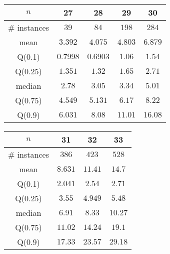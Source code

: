 \begin{tabular}{c|cccc} 
\hline 
$n$ & 27 & 28 & 29 & 30 \tabularnewline 
\hline 
\hline 
\# instances & $39$ & $84$ & $198$ & $284$ \tabularnewline 
mean & $3.392$ & $4.075$ & $4.803$ & $6.879$ \tabularnewline 
Q(0.1) & $0.7998$ & $0.6903$ & $1.06$ & $1.54$ \tabularnewline 
Q(0.25) & $1.351$ & $1.32$ & $1.65$ & $2.71$ \tabularnewline 
median & $2.78$ & $3.05$ & $3.34$ & $5.01$ \tabularnewline 
Q(0.75) & $4.549$ & $5.131$ & $6.17$ & $8.22$ \tabularnewline 
Q(0.9) & $6.031$ & $8.08$ & $11.01$ & $16.08$ \tabularnewline 
\hline 
\end{tabular} 
\medskip{} 

\begin{tabular}{c|ccc} 
\hline 
$n$ & 31 & 32 & 33 \tabularnewline 
\hline 
\hline 
\# instances & $386$ & $423$ & $528$ \tabularnewline 
mean & $8.631$ & $11.41$ & $14.7$ \tabularnewline 
Q(0.1) & $2.041$ & $2.54$ & $2.71$ \tabularnewline 
Q(0.25) & $3.55$ & $4.949$ & $5.48$ \tabularnewline 
median & $6.91$ & $8.33$ & $10.27$ \tabularnewline 
Q(0.75) & $11.02$ & $14.24$ & $19.1$ \tabularnewline 
Q(0.9) & $17.33$ & $23.57$ & $29.18$ \tabularnewline 
\hline 
\end{tabular} 
\medskip{} 

